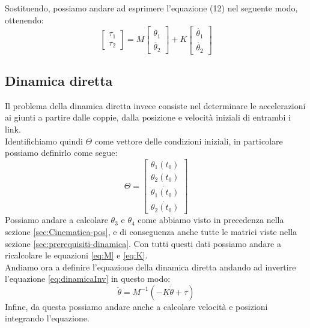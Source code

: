 Sostituendo, possiamo andare ad esprimere l'equazione (12) nel seguente modo, ottenendo:
\begin{equation}
    \begin{bmatrix}
    \tau_1 \\ \tau_2
    \end{bmatrix} = 
    M\begin{bmatrix}
    \ddot{\theta_1} \\ \ddot{\theta_2}
    \end{bmatrix}
    + K \begin{bmatrix}
    \dot{\theta_1} \\ \dot{\theta_2}
    \end{bmatrix}
\end{equation}
\subsection{Dinamica diretta}
Il problema della dinamica diretta invece consiste nel determinare le accelerazioni ai giunti a partire dalle coppie, dalla posizione e velocità iniziali di entrambi i link.
\\Identifichiamo quindi $\Theta$ come vettore delle condizioni iniziali, in particolare possiamo definirlo come segue:
\begin{equation*}
    \Theta = \begin{bmatrix}
    \theta_1(t_0) \\ \theta_2(t_0) \\ \dot{\theta_1(t_0)} \\ \dot{\theta_2(t_0)}
    \end{bmatrix}
\end{equation*}
Possiamo andare a calcolare $\theta_3$ e $\theta_4$ come abbiamo visto in precedenza nella sezione \ref{sec:Cinematica-pos}, e di conseguenza anche tutte le matrici viste nella sezione \ref{sec:prerequisiti-dinamica}. Con tutti questi dati possiamo andare a ricalcolare le equazioni \ref{eq:M} e \ref{eq:K}. 
\\Andiamo ora a definire l'equazione della dinamica diretta andando ad invertire l'equazione \ref{eq:dinamicaInv} in questo modo:
\begin{equation}
    \ddot{\theta} = M^{-1}(-K\dot{\theta}+\tau)
    \label{eq:dinamicaDiretta}
\end{equation}
Infine, da questa possiamo andare anche a calcolare velocità e posizioni integrando l'equazione.
